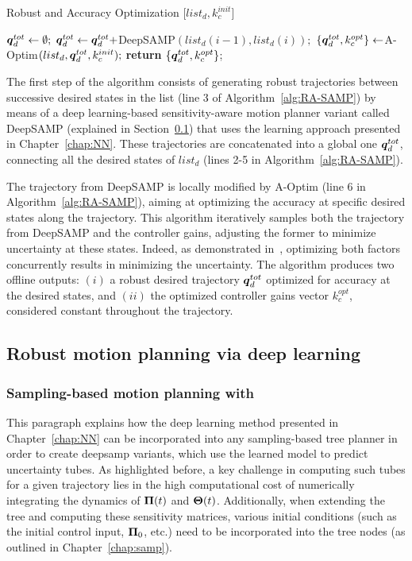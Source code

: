 \begin{algorithm}[htp]
\caption{Robust and Accuracy Optimization [$list_{d}, k_{c}^{init}$]}\label{alg:RA-SAMP}
\begin{algorithmic}[1]
\State $\boldsymbol{q}_d^{tot} \gets \emptyset;$
    \State $\boldsymbol{q}_d^{tot} \gets \boldsymbol{q}_d^{tot} + $DeepSAMP$(list_{d}(i-1),list_{d}(i));$
\EndFor
\State $\left \{ \boldsymbol{q}_d^{tot}, k_{c}^{opt} \right \} \gets $A-Optim$(list_{d},\boldsymbol{q}_d^{tot}, k_{c}^{init});$
\State \textbf{return} $\left \{ \boldsymbol{q}_d^{tot}, k_{c}^{opt}  \right \}$;
\end{algorithmic}
\end{algorithm}

The first step of the algorithm consists of generating robust trajectories between successive desired states in the list (line 3 of Algorithm~\ref{alg:RA-SAMP}) by means of a deep learning-based sensitivity-aware motion planner variant called DeepSAMP (explained in Section~\ref{sec:RSAMP}) that uses the learning approach presented in Chapter~\ref{chap:NN}.
These trajectories are concatenated into a global one $\boldsymbol{q}_d^{tot}$, connecting all the desired states of $list_{d}$ (lines 2-5 in Algorithm~\ref{alg:RA-SAMP}). 

The trajectory from DeepSAMP is locally modified by A-Optim (line 6 in Algorithm~\ref{alg:RA-SAMP}), aiming at optimizing the accuracy at specific desired states along the trajectory. 
This algorithm iteratively samples both the trajectory from DeepSAMP and the controller gains, adjusting the former to minimize uncertainty at these states. 
Indeed, as demonstrated in~\cite{AliIROS}, optimizing both factors concurrently results in minimizing the uncertainty.
The algorithm produces two offline outputs: $(i)$ a robust desired trajectory $\boldsymbol{q}_d^{tot}$ optimized for accuracy at the desired states, and $(ii)$ the optimized controller gains vector $k_{c}^{opt}$, considered constant throughout the trajectory.

\subsection{Robust motion planning via deep learning}\label{sec:RSAMP}

\subsubsection{Sampling-based motion planning with }

This paragraph explains how the deep learning method presented in Chapter~\ref{chap:NN} can be incorporated into any sampling-based tree planner in order to create \gls{deepsamp} variants, which use the learned model to predict uncertainty tubes.
As highlighted before, a key challenge in computing such tubes for a given trajectory lies in the high computational cost of numerically integrating the dynamics of $\boldsymbol{\Pi}(t)$ and $\boldsymbol{\Theta}(t)$.
Additionally, when extending the tree and computing these sensitivity matrices, various initial conditions (such as the initial control input, $\boldsymbol{\Pi}_0$, etc.) need to be incorporated into the tree nodes (as outlined in Chapter~\ref{chap:samp}).

